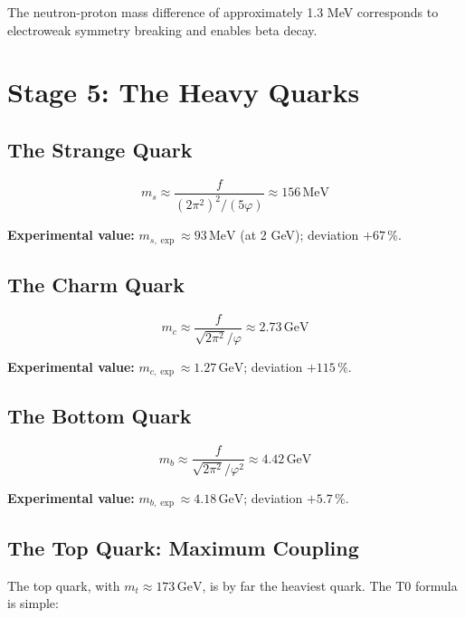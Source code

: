 	The neutron-proton mass difference of approximately 1.3 MeV corresponds to electroweak symmetry breaking and enables beta decay.
	
	\section{Stage 5: The Heavy Quarks}
	
	\subsection{The Strange Quark}
	
	\begin{equation}
		\boxed{m_s \approx \frac{f}{(2\pi^2)^2/(5\varphi)} \approx 156\,\text{MeV}}
	\end{equation}
	
	\textbf{Experimental value:} \(m_{s,\exp} \approx 93\,\text{MeV}\) (at 2 GeV); deviation $+67\,\%$.
	
	\subsection{The Charm Quark}
	
	\begin{equation}
		\boxed{m_c \approx \frac{f}{\sqrt{2\pi^2}/\varphi} \approx 2.73\,\text{GeV}}
	\end{equation}
	
	\textbf{Experimental value:} \(m_{c,\exp} \approx 1.27\,\text{GeV}\); deviation $+115\,\%$.
	
	\subsection{The Bottom Quark}
	
	\begin{equation}
		\boxed{m_b \approx \frac{f}{\sqrt{2\pi^2}/\varphi^2} \approx 4.42\,\text{GeV}}
	\end{equation}
	
	\textbf{Experimental value:} \(m_{b,\exp} \approx 4.18\,\text{GeV}\); deviation $+5.7\,\%$.
	
	\subsection{The Top Quark: Maximum Coupling}
	
	The top quark, with \(m_t \approx 173\,\text{GeV}\), is by far the heaviest quark. The T0 formula is simple:
	
